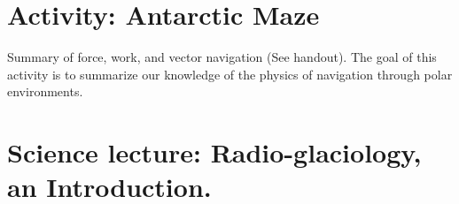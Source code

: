\documentclass{beamer}
\begin{document}
\section{Activity: Antarctic Maze}

\begin{frame}{Summary of force, work, and vector navigation}
(See handout).  The goal of this activity is to summarize our knowledge of the physics of navigation through polar environments.
\end{frame}

\section{Science lecture: Radio-glaciology, an Introduction.}
\end{document}
